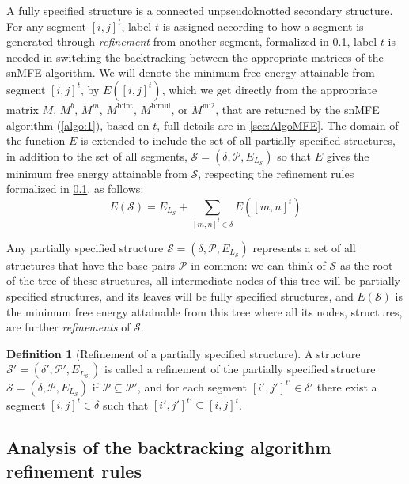 \documentclass[11pt,letterpaper]{article}  \usepackage[margin=1in]{geometry}
\theoremstyle{definition}  \newtheorem{Definition}[theorem]{Definition}
\newcommand{\snMFE}{snMFE\xspace}
\begin{document}
A fully specified structure is a connected unpseudoknotted secondary structure. For any segment $[i,j]^t$,  label $t$ is assigned according to how a segment is generated through \emph{refinement} from another segment, formalized in \cref{sec:backhigh}, 
label $t$ is needed in switching the backtracking between the appropriate matrices of the \snMFE algorithm.
We will denote the minimum free energy attainable from segment $[i,j]^t$, by $E([i,j]^t)$, which we get directly from the appropriate matrix $M$, $M^b$, $M^m$, $M^\text{b:int}$, $M^\text{b:mul}$, or $M^\text{m:2}$, that are returned  by the \snMFE algorithm (\cref{algo:1}), based on $t$, full details are in \cref{sec:AlgoMFE}. 
The domain of the  function $E$ is extended to include the set of all partially specified structures, in addition to the set of all segments,   
$\mathcal{S} = (\delta,\mathcal{P},E_{L_\mathcal{S}})$ so that 
$E$ gives  the minimum free energy attainable from $\mathcal{S}$, 
respecting the refinement rules formalized in \cref{sec:backhigh}, as follows:
\begin{equation}\label{eq:ES}
	E(\mathcal{S}) = E_{L_{\mathcal{S}}} 
	+ \sum \limits_{[m,n]^t \in \delta} E([m,n]^t)
\end{equation}

Any partially specified structure $\mathcal{S} = (\delta,\mathcal{P},E_{L_\mathcal{S}})$ represents a set of all structures that have the base pairs $\mathcal{P}$ in common:  we can think of $\mathcal{S}$ as the root of the tree of these structures, all intermediate nodes of this tree will be partially specified structures, and its leaves will be fully specified structures, and $E(\mathcal{S})$ is the minimum free energy attainable from this tree where all its nodes, structures, are further \emph{refinements} of $\mathcal{S}$.   

\begin{Definition}[Refinement of a partially specified structure]
	A structure $\mathcal{S}' = (\delta',\mathcal{P}',E_{L_{\mathcal{S}'}})$ is called a refinement of the partially specified structure $\mathcal{S} = (\delta,\mathcal{P},E_{L_\mathcal{S}})$ if $\mathcal{P} \subseteq \mathcal{P}'$, and for each segment $[i',j']^{t'} \in \delta'$ there exist a segment $[i,j]^t \in \delta$ such that $[i',j']^{t'} \subseteq [i,j]^t$.
\end{Definition}

\subsection{Analysis of the backtracking algorithm refinement rules}\label{sec:backhigh}
\end{document}
